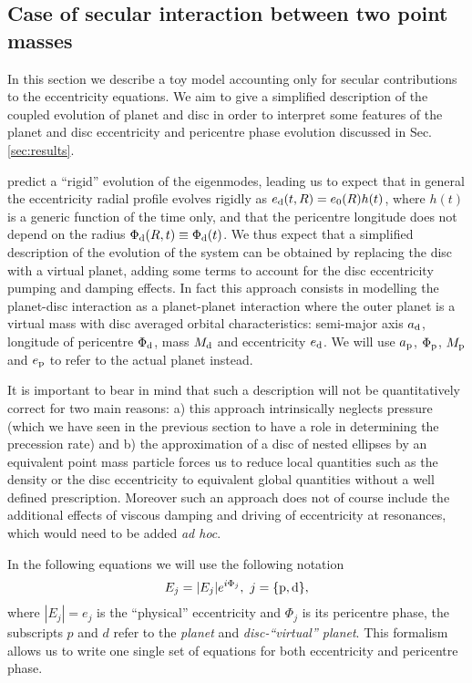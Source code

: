 \documentclass[usenatbib,a4paper,times,fleqn]{mnras}
\begin{document}
\subsection{Case of secular interaction between two point masses}
\label{sec:toymodel}
In this section we describe a toy model accounting only for secular contributions to the eccentricity equations. We aim to give a simplified description of the coupled evolution of planet and disc in order to interpret some features of the planet and disc eccentricity and pericentre phase evolution discussed in Sec. \ref{sec:results}.

\citet{teyssandier2017} predict a ``rigid'' evolution of the eigenmodes, leading us to expect that in general the eccentricity radial profile evolves rigidly as $e_{\rm d}(t,R)=e_{0}(R)h(t)$, where $h(t)$ is a generic function of the time only, and that the pericentre longitude does not depend on the radius $\Phi_{\rm d}(R,t)\equiv \Phi_{\rm d}(t)$. We thus expect that a simplified description of the evolution of the system can be obtained by replacing the disc with a virtual planet, adding some terms to account for the disc eccentricity pumping and damping effects. 
In fact this approach consists in modelling the planet-disc interaction as a planet-planet interaction where the outer planet is a virtual mass with disc averaged orbital characteristics: semi-major axis $a_{\rm d}$, longitude of pericentre $\Phi_{\rm d}$, mass $M_{\rm d}$ and eccentricity $e_{\rm d}$. We will use $a_{\rm p}$, $\Phi_{\rm p}$, $M_{\rm p}$ and $e_{\rm p}$ to refer to the actual planet instead. 

It is important to bear in mind that such a description will not be quantitatively correct for two main reasons: a) this approach intrinsically neglects pressure (which we have seen in the previous section to have a role in determining the precession rate) and b) the approximation of a disc of nested ellipses by an equivalent point mass particle forces us to reduce local quantities such as the density or the disc eccentricity to equivalent global quantities without a well defined prescription. Moreover such an approach does not of course include the additional effects of viscous damping and driving of eccentricity at resonances, which would need to be added {\it ad hoc}.

In the following equations we will use the following notation
\begin{equation}
E_j=|E_j|e^{i\Phi_j},\ j=\{{\rm p,d}\},
\end{equation}
where $|E_j|=e_j$ is the ``physical'' eccentricity and $\Phi_j$ is its pericentre phase, the subscripts $p$ and $d$ refer to the {\it planet} and {\it disc-``virtual'' planet}. This formalism allows us to write one single set of equations for both eccentricity and pericentre phase.
\end{document}
